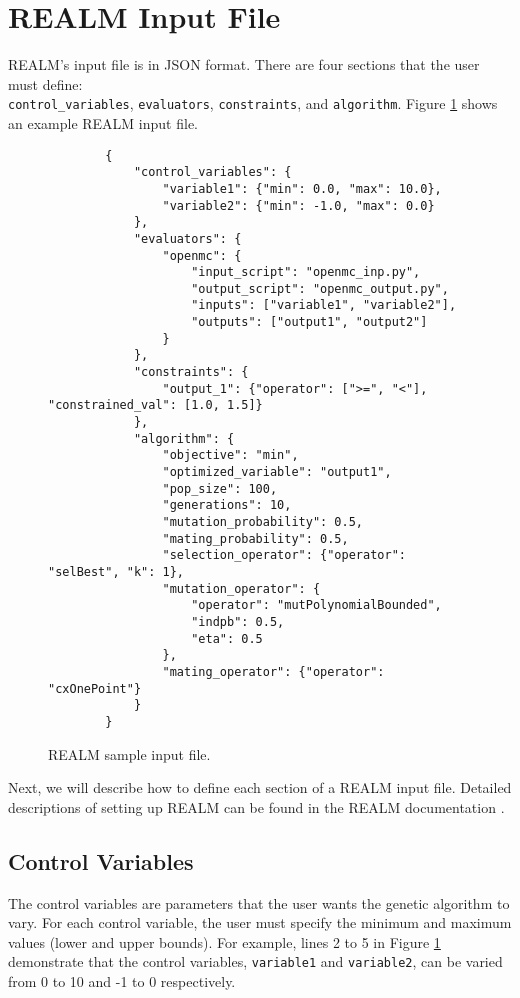 \section{REALM Input File}
REALM's input file is in JSON format. 
There are four sections that the user must define: \\ \texttt{control\_variables}, 
\texttt{evaluators}, \texttt{constraints}, and \texttt{algorithm}. 
Figure \ref{fig:realm-input} shows an example REALM input file. 
\begin{figure}[]
    \begin{verbatim}
        {
            "control_variables": {
                "variable1": {"min": 0.0, "max": 10.0}, 
                "variable2": {"min": -1.0, "max": 0.0}
            }, 
            "evaluators": {
                "openmc": {
                    "input_script": "openmc_inp.py",
                    "output_script": "openmc_output.py", 
                    "inputs": ["variable1", "variable2"],
                    "outputs": ["output1", "output2"]
                }
            }, 
            "constraints": {
                "output_1": {"operator": [">=", "<"], "constrained_val": [1.0, 1.5]}
            }, 
            "algorithm": {
                "objective": "min", 
                "optimized_variable": "output1", 
                "pop_size": 100, 
                "generations": 10, 
                "mutation_probability": 0.5,
                "mating_probability": 0.5,
                "selection_operator": {"operator": "selBest", "k": 1},
                "mutation_operator": {
                    "operator": "mutPolynomialBounded",
                    "indpb": 0.5,
                    "eta": 0.5
                },
                "mating_operator": {"operator": "cxOnePoint"}
            }
        }
    \end{verbatim}
    \caption{REALM sample input file.}
    \label{fig:realm-input}
\end{figure}
Next, we will describe how to define each section of a REALM input file. 
Detailed descriptions of setting up REALM can be found in the REALM 
documentation \cite{chee_arfcrealm_2021}. 

\subsection{Control Variables}
The control variables are parameters that the user wants the genetic 
algorithm to vary. 
For each control variable, the user must specify the minimum and maximum values 
(lower and upper bounds). 
For example, lines 2 to 5 in Figure \ref{fig:realm-input} demonstrate that the 
control variables, \texttt{variable1} and \texttt{variable2}, 
can be varied from 0 to 10 and -1 to 0 respectively. 

